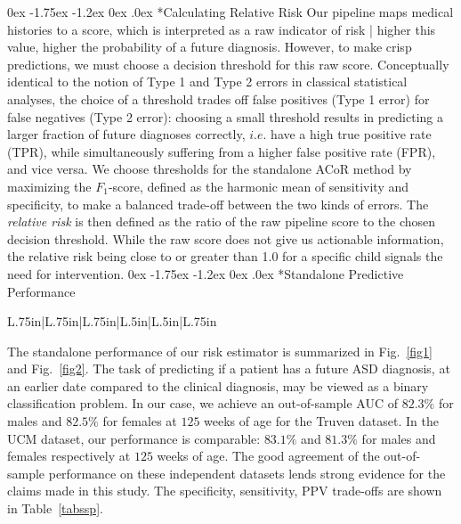 \documentclass[onecolumn, compsoc,11pt]{IEEEtran}
\makeatletter
\renewcommand\subsection{\@startsection {subsection}{2}{\z@}%
                                   {0ex \@plus -1.75ex \@minus -1.2ex}%
                                   {0ex \@plus.0ex}%
                                   {\fontsize{11}{11}\selectfont\bfseries\sffamily\color{black}}}
\renewcommand{\captionN}[1]{\caption{\color{CadetBlue4!80!black} \sffamily \fontsize{9}{10}\selectfont #1  }}
\def\ZERO{ACoR\xspace}
\makeatother
\begin{document}
\subsection*{Calculating Relative Risk}
Our pipeline maps medical histories to a  score, which is interpreted as a raw indicator of 
risk | higher this value, higher the probability of a future diagnosis. However, to make crisp predictions, we must choose  a decision threshold for this raw score. Conceptually identical to the notion of Type 1 and Type 2 errors in classical statistical analyses, the choice of a threshold trades off false positives (Type 1 error) for false negatives (Type 2 error): choosing a small threshold  results in predicting a larger fraction of future diagnoses correctly, $i.e.$ have a high true positive rate (TPR), while simultaneously suffering from a higher false positive rate (FPR), and vice versa.
We choose thresholds for the standalone \ZERO method by  maximizing the $F_1$-score, defined as the harmonic mean of sensitivity and specificity, to make a   balanced trade-off between the two kinds of errors.
%
The \textit{relative risk} is then defined as the ratio of the raw pipeline score to the chosen decision threshold. While the raw score does not give us  actionable information,  the relative risk being close to or greater than 1.0 for a specific child signals the need for intervention.
%
\subsection*{Standalone Predictive Performance}
\def\RCOL{\rowcolor{teal!40}}
\begin{table}[t]   
\centering 
\captionN{Standalone \ZERO PPV Achieved}\label{tabssp}
\footnotesize
{}
%
%
\begin{tabular}{L{.75in}|L{.75in}|L{.75in}|L{.5in}|L{.5in}|L{.75in}}
\hline

\end{tabular}
\end{table}  
The standalone performance of our risk estimator is summarized  in Fig.~\ref{fig1} and Fig.~\ref{fig2}. The task of predicting if a patient has a future ASD diagnosis, at an earlier date compared to the clinical diagnosis,  may be viewed as a binary classification problem.
In our case, we achieve an out-of-sample AUC of $82.3\%$ for males and $82.5\%$ for females at $125$ weeks of age for the Truven dataset. In the UCM dataset, our performance is comparable: $83.1\%$ and $81.3\%$ for males and females respectively at $125$ weeks of age. The good agreement of the out-of-sample performance on these independent datasets lends strong evidence for the claims made in this study. The specificity, sensitivity, PPV trade-offs are shown in Table~\ref{tabssp}.
\end{document}

